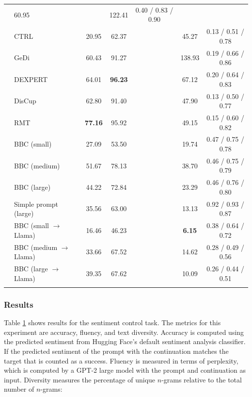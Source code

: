 \documentclass[phd,electronic,oneside,twosidetoc,letterpaper,chaptercenter,parttop,lof]{byumsphd}
\begin{document}
\begin{table}[t]
{\begin{tabular}{llccccc}
 & 60.95 & & 122.41 & 0.40 / 0.83 / 0.90 \\ 
    & CTRL \cite{keskar2019ctrl} & 20.95 & 62.37 & & 45.27 & 0.13 / 0.51 / 0.78 \\
    & GeDi \cite{krause2021gedi} & 60.43 & 91.27 & & 138.93 & 0.19 / 0.66 / 0.86 \\
    & DEXPERT \cite{liu2021dexpert} & 64.01 & \textbf{96.23} & & 67.12 & 0.20 / 0.64 / 0.83 \\
    & DisCup \cite{zhang2022discup} & 62.80 & 91.40 & & 47.90 & 0.13 / 0.50 / 0.77 \\
    & RMT \cite{zhang2023rmt} & \textbf{77.16} & 95.92 & & 49.15 & 0.15 / 0.60 / 0.82 \\
    \cmidrule(r){2-7}
    & BBC (small) & 27.09 & 53.50 &  & 19.74 & 0.47 / 0.75 / 0.78 \\
    & BBC (medium) & 51.67 & 78.13 &  & 38.70 & 0.46 / 0.75 / 0.79 \\
    & BBC (large) & 44.22 & 72.84 &  & 23.29 & 0.46 / 0.76 / 0.80 \\
    & Simple prompt (large) & 35.56 & 63.00 &  & 13.13 & 0.92 / 0.93 / 0.87 \\
    & BBC (small \(\rightarrow\) Llama) & 16.46 & 46.23 & & \textbf{6.15} & 0.38 / 0.64 / 0.72 \\
    & BBC (medium \(\rightarrow\) Llama) & 33.66 & 67.52 & & 14.62 & 0.28 / 0.49 / 0.56 \\
    & BBC (large \(\rightarrow\) Llama) & 39.35 & 67.62 & & 10.09 & 0.26 / 0.44 / 0.51 \\
    \bottomrule
  \label{sentiment-control-table-results}
  \end{tabular}
  }
\end{table}

\subsubsection{Results}

Table \ref{sentiment-control-table-results} shows results for the sentiment control task. 
The metrics for this experiment are accuracy, fluency, and text diversity. 
Accuracy is computed using the predicted sentiment from Hugging Face's default sentiment analysis classifier. 
If the predicted sentiment of the prompt with the continuation matches the target that is counted as a success. 
Fluency is measured in terms of perplexity, which is computed by a GPT-2 large model with the prompt and continuation as input. 
Diversity measures the percentage of unique $n$-grams relative to the total number of \(n\)-grams:
\end{document}
